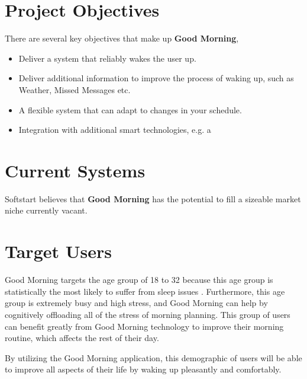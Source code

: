 \documentclass[11pt]{article}
\begin{document}

%
\section{Project Objectives}\label{project-objectives}

There are several key objectives that make up \textbf{Good Morning},

\begin{itemize}
\item
  Deliver a system that reliably wakes the user up.
\item
  Deliver additional information to improve the process of waking up, such as Weather, Missed Messages etc.
\item
  A flexible system that can adapt to changes in your schedule.
\item
  Integration with additional smart technologies, e.g. a 
\end{itemize}


%
\section{Current Systems}\label{current-systems}

Softstart believes that \textbf{Good Morning} has the potential to fill
a sizeable market niche currently vacant.


%
\section{Target Users}\label{target-users}

Good Morning targets the age group of 18 to 32 because this age group is statistically the most likely to suffer from sleep issues \cite{sleepdisorders}. Furthermore, this age group is extremely busy and high stress, and Good Morning can help by cognitively offloading all of the stress of morning planning. This group of users can benefit greatly from Good Morning technology to improve their morning routine, which affects the rest of their day.

By utilizing the Good Morning application, this demographic of users will be able to improve all aspects of their life by waking up pleasantly and comfortably.
\end{document}
